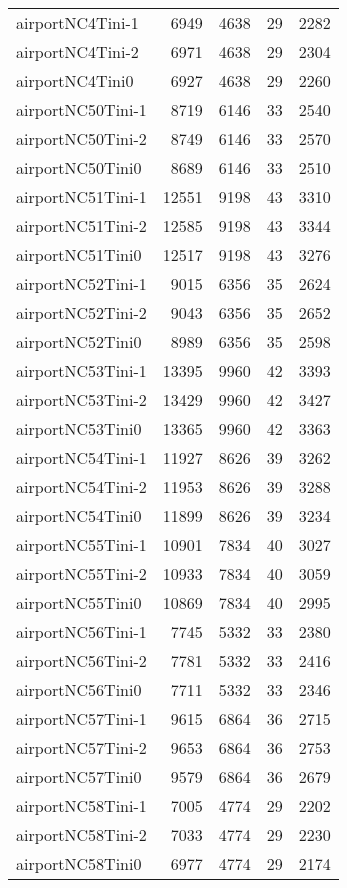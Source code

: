 \begin{tabular}{lrrrr}
airportNC4Tini-1 & 6949 & 4638 & 29 & 2282 \\
airportNC4Tini-2 & 6971 & 4638 & 29 & 2304 \\
airportNC4Tini0 & 6927 & 4638 & 29 & 2260 \\
airportNC50Tini-1 & 8719 & 6146 & 33 & 2540 \\
airportNC50Tini-2 & 8749 & 6146 & 33 & 2570 \\
airportNC50Tini0 & 8689 & 6146 & 33 & 2510 \\
airportNC51Tini-1 & 12551 & 9198 & 43 & 3310 \\
airportNC51Tini-2 & 12585 & 9198 & 43 & 3344 \\
airportNC51Tini0 & 12517 & 9198 & 43 & 3276 \\
airportNC52Tini-1 & 9015 & 6356 & 35 & 2624 \\
airportNC52Tini-2 & 9043 & 6356 & 35 & 2652 \\
airportNC52Tini0 & 8989 & 6356 & 35 & 2598 \\
airportNC53Tini-1 & 13395 & 9960 & 42 & 3393 \\
airportNC53Tini-2 & 13429 & 9960 & 42 & 3427 \\
airportNC53Tini0 & 13365 & 9960 & 42 & 3363 \\
airportNC54Tini-1 & 11927 & 8626 & 39 & 3262 \\
airportNC54Tini-2 & 11953 & 8626 & 39 & 3288 \\
airportNC54Tini0 & 11899 & 8626 & 39 & 3234 \\
airportNC55Tini-1 & 10901 & 7834 & 40 & 3027 \\
airportNC55Tini-2 & 10933 & 7834 & 40 & 3059 \\
airportNC55Tini0 & 10869 & 7834 & 40 & 2995 \\
airportNC56Tini-1 & 7745 & 5332 & 33 & 2380 \\
airportNC56Tini-2 & 7781 & 5332 & 33 & 2416 \\
airportNC56Tini0 & 7711 & 5332 & 33 & 2346 \\
airportNC57Tini-1 & 9615 & 6864 & 36 & 2715 \\
airportNC57Tini-2 & 9653 & 6864 & 36 & 2753 \\
airportNC57Tini0 & 9579 & 6864 & 36 & 2679 \\
airportNC58Tini-1 & 7005 & 4774 & 29 & 2202 \\
airportNC58Tini-2 & 7033 & 4774 & 29 & 2230 \\
airportNC58Tini0 & 6977 & 4774 & 29 & 2174 \\

\end{tabular}
